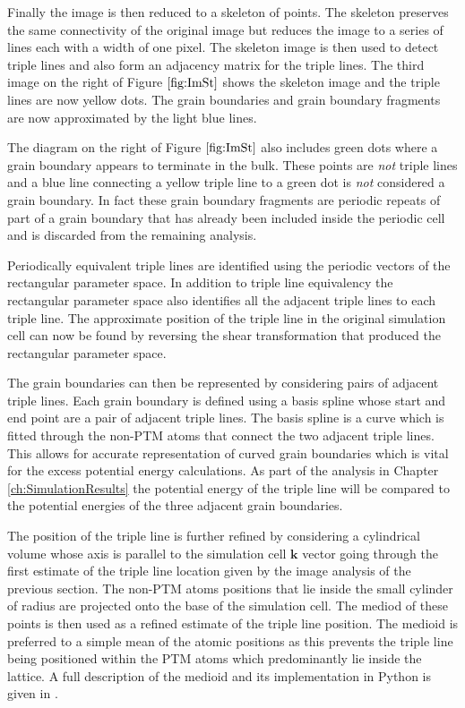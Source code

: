 \documentclass[12pt,a4paper,openany]{report}
\begin{document}
Finally the image is then reduced to a skeleton of points. The skeleton preserves the same connectivity of the original image but reduces the image to a series of lines each with a width of one pixel. The skeleton image is then used to detect triple lines and also form an adjacency matrix for the triple lines. The third image on the right of Figure $\ref{fig:ImSt}$ shows the skeleton image and the triple lines are now yellow dots. The grain boundaries and grain boundary fragments are now approximated by the light blue lines.

The diagram on the right of Figure $\ref{fig:ImSt}$ also includes green dots  where a grain boundary appears to terminate in the bulk. These points are \emph{not} triple lines and a blue line connecting a yellow triple line to a green dot is \emph{not} considered a grain boundary. In fact these grain boundary fragments are periodic repeats of part of a grain boundary that has already been included inside the periodic cell and is discarded from the remaining analysis.
 
Periodically equivalent triple lines are identified using the periodic vectors of the rectangular parameter space. In addition to triple line equivalency the rectangular parameter space also identifies all the adjacent triple lines to each triple line. 
The approximate position of the triple line in the original simulation cell can now be found by reversing the shear transformation that produced the rectangular parameter space.

The grain boundaries can then be represented by considering pairs of adjacent triple lines. Each grain boundary is defined using a basis spline whose start and end point are a pair of adjacent triple lines. The basis spline is a curve which is fitted through the non-PTM atoms that connect the two adjacent triple lines. This allows for accurate representation of curved grain boundaries which is vital for the excess potential energy calculations. As part of the analysis in Chapter \ref{ch:SimulationResults} the potential energy of the triple line will be compared to the potential energies of the three adjacent grain boundaries.  

The position of the triple line is further refined by considering a cylindrical volume whose axis is parallel to the simulation cell $\mathbf{k}$ vector going through the first estimate of the triple line location given by the image analysis of the previous section. The non-PTM atoms positions that lie inside the small cylinder of radius are projected onto the base of the simulation cell. The mediod of these points is then used as a refined estimate of the triple line position. The medioid is preferred to a simple mean of the atomic positions as this prevents the triple line being positioned within the PTM atoms which predominantly lie inside the lattice. A full description of the medioid and its implementation in Python is given in \cite{Bauckhage2015}. 
\end{document}
